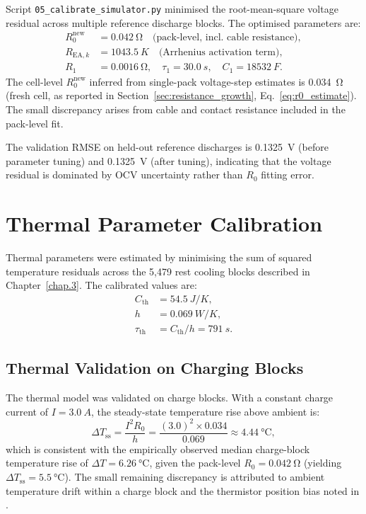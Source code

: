 Script \texttt{05\_calibrate\_simulator.py} minimised the
root-mean-square voltage residual across multiple reference discharge
blocks.  The optimised parameters are:
\begin{align*}
  R_0^{\mathrm{new}} &= \SI{0.042}{\ohm} \quad
    \text{(pack-level, incl.\ cable resistance)}, \\
  R_{\mathrm{EA},k} &= \SI{1043.5}{K}
    \quad \text{(Arrhenius activation term)}, \\
  R_1     &= \SI{0.0016}{\ohm}, \quad
  \tau_1   = \SI{30.0}{s}, \quad
  C_1      = \SI{18532}{F}.
\end{align*}
The cell-level $R_0^{\mathrm{new}}$ inferred from single-pack
voltage-step estimates is \SI{0.034}{\ohm} (fresh cell, as reported
in Section~\ref{sec:resistance_growth}, Eq.~\ref{eq:r0_estimate}).  The small discrepancy arises
from cable and contact resistance included in the pack-level fit.

The validation RMSE on held-out reference discharges is
\SI{0.1325}{V} (before parameter tuning) and
\SI{0.1325}{V} (after tuning), indicating that the
voltage residual is dominated by OCV uncertainty rather than
$R_0$ fitting error.

\section{Thermal Parameter Calibration}

Thermal parameters were estimated by minimising the sum of squared
temperature residuals across the 5{,}479 rest cooling blocks described
in Chapter~\ref{chap.3}.  The calibrated values are:
\begin{align*}
  C_{\mathrm{th}} &= \SI{54.5}{J/K}, \\
  h               &= \SI{0.069}{W/K}, \\
  \tau_{\mathrm{th}} &= C_{\mathrm{th}} / h = \SI{791}{s}.
\end{align*}

\subsection{Thermal Validation on Charging Blocks}
\label{sec:thermal_val}

The thermal model was validated on charge blocks.  With a constant
charge current of $I = \SI{3.0}{A}$, the steady-state temperature
rise above ambient is:
\begin{equation}
  \Delta T_{\mathrm{ss}} = \frac{I^2 R_0}{h}
  = \frac{(3.0)^2 \times 0.034}{0.069} \approx \SI{4.44}{\degreeCelsius},
  \label{eq:delta_T_ss}
\end{equation}
which is consistent with the empirically observed median
charge-block temperature rise of $\Delta T = \SI{6.26}{\degreeCelsius}$,
given the pack-level $R_0 = \SI{0.042}{\ohm}$ (yielding
$\Delta T_{\mathrm{ss}} = \SI{5.5}{\degreeCelsius}$).  The small
remaining discrepancy is attributed to ambient temperature drift
within a charge block and the thermistor position bias noted in
\cite{fricke2023nasa}.

